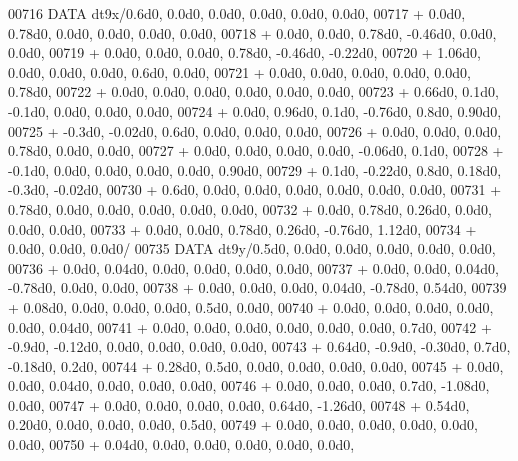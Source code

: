 \begin{DoxyCode}
00716       \textcolor{keyword}{DATA}              dt9x/0.6d0, 0.0d0, 0.0d0, 0.0d0, 0.0d0, 0.0d0,
00717      +                  0.0d0, 0.78d0, 0.0d0, 0.0d0, 0.0d0, 0.0d0,
00718      +                  0.0d0, 0.0d0, 0.78d0, -0.46d0, 0.0d0, 0.0d0,
00719      +                  0.0d0, 0.0d0, 0.0d0, 0.78d0, -0.46d0, -0.22d0,
00720      +                  1.06d0, 0.0d0, 0.0d0, 0.0d0, 0.6d0, 0.0d0,
00721      +                  0.0d0, 0.0d0, 0.0d0, 0.0d0, 0.0d0, 0.78d0,
00722      +                  0.0d0, 0.0d0, 0.0d0, 0.0d0, 0.0d0, 0.0d0,
00723      +                  0.66d0, 0.1d0, -0.1d0, 0.0d0, 0.0d0, 0.0d0,
00724      +                  0.0d0, 0.96d0, 0.1d0, -0.76d0, 0.8d0, 0.90d0,
00725      +                  -0.3d0, -0.02d0, 0.6d0, 0.0d0, 0.0d0, 0.0d0,
00726      +                  0.0d0, 0.0d0, 0.0d0, 0.78d0, 0.0d0, 0.0d0,
00727      +                  0.0d0, 0.0d0, 0.0d0, 0.0d0, -0.06d0, 0.1d0,
00728      +                  -0.1d0, 0.0d0, 0.0d0, 0.0d0, 0.0d0, 0.90d0,
00729      +                  0.1d0, -0.22d0, 0.8d0, 0.18d0, -0.3d0, -0.02d0,
00730      +                  0.6d0, 0.0d0, 0.0d0, 0.0d0, 0.0d0, 0.0d0, 0.0d0,
00731      +                  0.78d0, 0.0d0, 0.0d0, 0.0d0, 0.0d0, 0.0d0,
00732      +                  0.0d0, 0.78d0, 0.26d0, 0.0d0, 0.0d0, 0.0d0,
00733      +                  0.0d0, 0.0d0, 0.78d0, 0.26d0, -0.76d0, 1.12d0,
00734      +                  0.0d0, 0.0d0, 0.0d0/
00735       \textcolor{keyword}{DATA}              dt9y/0.5d0, 0.0d0, 0.0d0, 0.0d0, 0.0d0, 0.0d0,
00736      +                  0.0d0, 0.04d0, 0.0d0, 0.0d0, 0.0d0, 0.0d0,
00737      +                  0.0d0, 0.0d0, 0.04d0, -0.78d0, 0.0d0, 0.0d0,
00738      +                  0.0d0, 0.0d0, 0.0d0, 0.04d0, -0.78d0, 0.54d0,
00739      +                  0.08d0, 0.0d0, 0.0d0, 0.0d0, 0.5d0, 0.0d0,
00740      +                  0.0d0, 0.0d0, 0.0d0, 0.0d0, 0.0d0, 0.04d0,
00741      +                  0.0d0, 0.0d0, 0.0d0, 0.0d0, 0.0d0, 0.0d0, 0.7d0,
00742      +                  -0.9d0, -0.12d0, 0.0d0, 0.0d0, 0.0d0, 0.0d0,
00743      +                  0.64d0, -0.9d0, -0.30d0, 0.7d0, -0.18d0, 0.2d0,
00744      +                  0.28d0, 0.5d0, 0.0d0, 0.0d0, 0.0d0, 0.0d0,
00745      +                  0.0d0, 0.0d0, 0.04d0, 0.0d0, 0.0d0, 0.0d0,
00746      +                  0.0d0, 0.0d0, 0.0d0, 0.7d0, -1.08d0, 0.0d0,
00747      +                  0.0d0, 0.0d0, 0.0d0, 0.0d0, 0.64d0, -1.26d0,
00748      +                  0.54d0, 0.20d0, 0.0d0, 0.0d0, 0.0d0, 0.5d0,
00749      +                  0.0d0, 0.0d0, 0.0d0, 0.0d0, 0.0d0, 0.0d0,
00750      +                  0.04d0, 0.0d0, 0.0d0, 0.0d0, 0.0d0, 0.0d0,

\end{DoxyCode}
